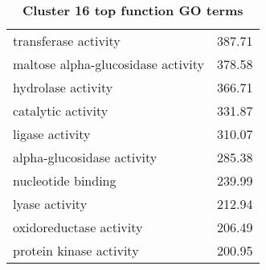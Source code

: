 \begin{table}[h]
\begin{center}
\begin{tabular}{p{}r}
transferase activity                                             & 387.71                      \\
maltose alpha-glucosidase activity                               & 378.58                      \\
hydrolase activity                                               & 366.71                      \\
catalytic activity                                               & 331.87                      \\
ligase activity                                                  & 310.07                      \\
alpha-glucosidase activity                                       & 285.38                      \\
nucleotide binding                                               & 239.99                      \\
lyase activity                                                   & 212.94                      \\
oxidoreductase activity                                          & 206.49                      \\
protein kinase activity                                          & 200.95                      \\ \bottomrule                   
\end{tabular}
\end{center}

\caption[Cluster 16 top function GO terms]{\sf \textbf{Cluster 16 top function GO terms}}
\label{tab:cls16-function}
\end{table}